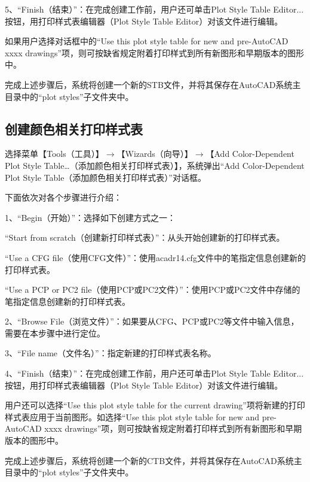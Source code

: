 5、“Finish（结束）”：在完成创建工作前，用户还可单击Plot Style Table Editor...按钮，用打印样式表编辑器（Plot Style Table Editor）对该文件进行编辑。

如果用户选择对话框中的“Use this plot style table for new and pre-AutoCAD xxxx drawings”项，则可按缺省规定附着打印样式到所有新图形和早期版本的图形中。

完成上述步骤后，系统将创建一个新的STB文件，并将其保存在AutoCAD系统主目录中的“plot styles”子文件夹中。



\subsection{创建颜色相关打印样式表}

选择菜单【Tools（工具）】$\to$【Wizards（向导）】$\to$【Add Color-Dependent Plot Style Table…（添加颜色相关打印样式表）】，系统弹出“Add Color-Dependent Plot Style Table（添加颜色相关打印样式表）”对话框。

下面依次对各个步骤进行介绍：

1、“Begin（开始）”：选择如下创建方式之一：

\begin{compactitem}
\item “Start from scratch（创建新打印样式表）”：从头开始创建新的打印样式表。
\item “Use a CFG file（使用CFG文件）”：使用acadr14.cfg文件中的笔指定信息创建新的打印样式表。
\item “Use a PCP or PC2 file（使用PCP或PC2文件）”：使用PCP或PC2文件中存储的笔指定信息创建新的打印样式表。
\end{compactitem}

2、“Browse File（浏览文件）”：如果要从CFG、PCP或PC2等文件中输入信息，需要在本步骤中进行定位。

3、“File name（文件名）”：指定新建的打印样式表名称。

4、“Finish（结束）”：在完成创建工作前，用户还可单击Plot Style Table Editor...按钮，用打印样式表编辑器（Plot Style Table Editor）对该文件进行编辑。

用户还可以选择“Use this plot style table for the current drawing”项将新建的打印样式表应用于当前图形。如选择“Use this plot style table for new and pre-AutoCAD xxxx drawings”项，则可按缺省规定附着打印样式到所有新图形和早期版本的图形中。

完成上述步骤后，系统将创建一个新的CTB文件，并将其保存在AutoCAD系统主目录中的“plot styles”子文件夹中。



